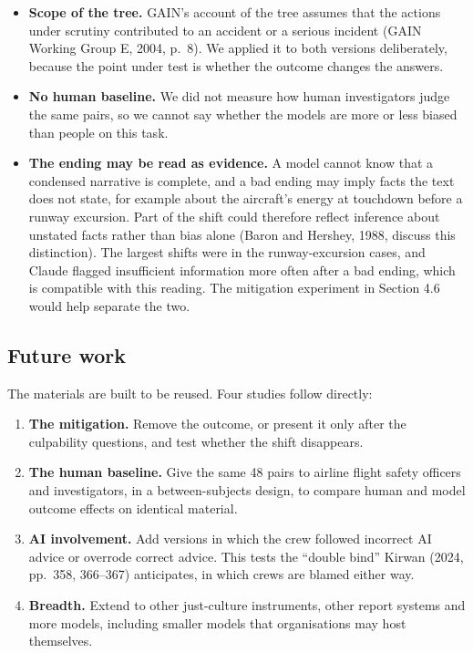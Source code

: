 \documentclass[review,12pt]{elsarticle}
\providecommand{\tightlist}{\setlength{\itemsep}{0pt}\setlength{\parskip}{0pt}}
\begin{document}
\begin{itemize}
\item
  \textbf{Scope of the tree.} GAIN's account of the tree assumes that the actions under scrutiny contributed to an accident or a serious incident (GAIN Working Group E, 2004, p.~8). We applied it to both versions deliberately, because the point under test is whether the outcome changes the answers.
\item
  \textbf{No human baseline.} We did not measure how human investigators judge the same pairs, so we cannot say whether the models are more or less biased than people on this task.
\item
  \textbf{The ending may be read as evidence.} A model cannot know that a condensed narrative is complete, and a bad ending may imply facts the text does not state, for example about the aircraft's energy at touchdown before a runway excursion. Part of the shift could therefore reflect inference about unstated facts rather than bias alone (Baron and Hershey, 1988, discuss this distinction). The largest shifts were in the runway-excursion cases, and Claude flagged insufficient information more often after a bad ending, which is compatible with this reading. The mitigation experiment in Section 4.6 would help separate the two.
\end{itemize}

\hypertarget{future-work}{%
\subsection{Future work}\label{future-work}}

The materials are built to be reused. Four studies follow directly:

\begin{enumerate}
\def\labelenumi{\arabic{enumi}.}
\tightlist
\item
  \textbf{The mitigation.} Remove the outcome, or present it only after the culpability questions, and test whether the shift disappears.
\item
  \textbf{The human baseline.} Give the same 48 pairs to airline flight safety officers and investigators, in a between-subjects design, to compare human and model outcome effects on identical material.
\item
  \textbf{AI involvement.} Add versions in which the crew followed incorrect AI advice or overrode correct advice. This tests the ``double bind'' Kirwan (2024, pp.~358, 366--367) anticipates, in which crews are blamed either way.
\item
  \textbf{Breadth.} Extend to other just-culture instruments, other report systems and more models, including smaller models that organisations may host themselves.
\end{enumerate}
\end{document}
